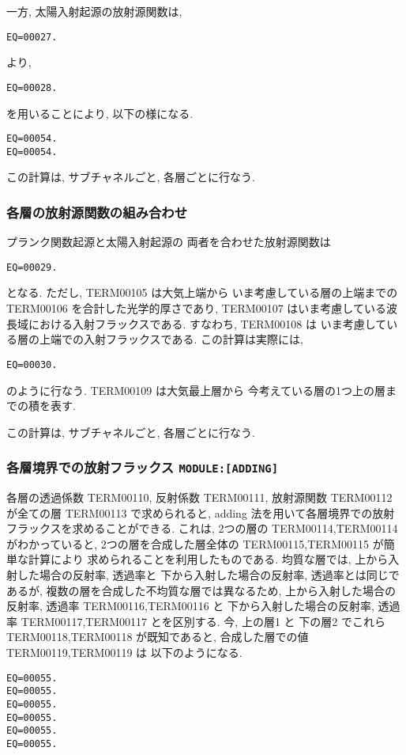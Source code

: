 一方,  太陽入射起源の放射源関数は,
\begin{verbatim}
EQ=00027.
\end{verbatim}
より,
\begin{verbatim}
EQ=00028.
\end{verbatim}
を用いることにより, 以下の様になる.
\begin{verbatim}
EQ=00054.
EQ=00054.
\end{verbatim}

この計算は, サブチャネルごと, 各層ごとに行なう.

\subsubsection{各層の放射源関数の組み合わせ}

プランク関数起源と太陽入射起源の
両者を合わせた放射源関数は
\begin{verbatim}
EQ=00029.
\end{verbatim}
となる. ただし, TERM00105 は大気上端から
いま考慮している層の上端までの
TERM00106 を合計した光学的厚さであり, 
TERM00107 はいま考慮している波長域における入射フラックスである.
すなわち, TERM00108 は
いま考慮している層の上端での入射フラックスである.
%
この計算は実際には, 
\begin{verbatim}
EQ=00030.
\end{verbatim}
のように行なう. TERM00109 は大気最上層から
今考えている層の1つ上の層までの積を表す.

この計算は, サブチャネルごと, 各層ごとに行なう.

\subsubsection{各層境界での放射フラックス \texttt{MODULE:[ADDING]}}

各層の透過係数 TERM00110, 反射係数 TERM00111, 放射源関数 TERM00112
が全ての層 TERM00113 で求められると,
adding 法を用いて各層境界での放射フラックスを求めることができる.
これは, 2つの層の TERM00114,TERM00114 がわかっていると,
2つの層を合成した層全体の TERM00115,TERM00115 が簡単な計算により
求められることを利用したものである.
均質な層では, 上から入射した場合の反射率, 透過率と
下から入射した場合の反射率, 透過率とは同じであるが,
複数の層を合成した不均質な層では異なるため,
上から入射した場合の反射率, 透過率 TERM00116,TERM00116 と
下から入射した場合の反射率, 透過率 TERM00117,TERM00117 とを区別する.
今, 上の層1 と 下の層2 でこれら
TERM00118,TERM00118 が既知であると,
合成した層での値
TERM00119,TERM00119 は
以下のようになる.
\begin{verbatim}
EQ=00055.
EQ=00055.
EQ=00055.
EQ=00055.
EQ=00055.
EQ=00055.
\end{verbatim}

